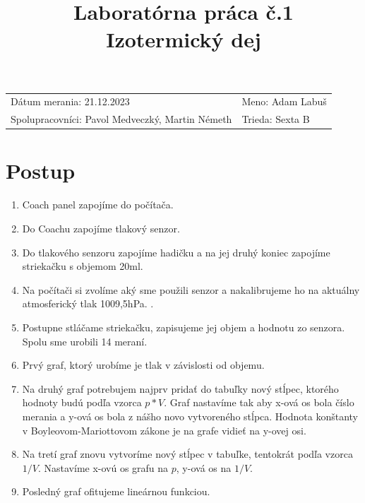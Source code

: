 \documentclass[12pt]{extarticle}
\title{%
Laboratórna práca č.1\\
Izotermický dej
}
\author{}
\date{}
\begin{document}
\begin{titlepage}
	\maketitle
	\thispagestyle{empty}
	\vfill
	\large
	\begin{tabular}{ll}
		Dátum merania: 21.12.2023 \hfill &Meno: Adam Labuš \\
		Spolupracovníci: Pavol Medveczký, Martin Németh &Trieda: Sexta B \\
	\end{tabular}
	\vspace{100pt}
\end{titlepage}

\def\present#1#2{%
	\begin{samepage}
	{\large #1}\\
	\begin{center}
		#2\\[1em]
	\end{center}
	\end{samepage}
}

\def\graf#1#2{
	\present{#1}{
		\begin{tikzpicture}
			#2
		\end{tikzpicture}
	}
}

\section{Postup}
\begin{enumerate}
\item Coach panel zapojíme do počítača.
\item Do Coachu zapojíme tlakový senzor.
\item Do tlakového senzoru zapojíme hadičku a na jej druhý koniec zapojíme striekačku s objemom 20ml.
\item Na počítači si zvolíme aký sme použili senzor a nakalibrujeme ho na aktuálny atmosferický tlak 1009,5hPa.
.
\item Postupne stláčame striekačku, zapisujeme jej objem a hodnotu zo senzora. Spolu sme urobili 14 meraní.
\item Prvý graf, ktorý urobíme je tlak v závislosti od objemu.
\item Na druhý graf potrebujem najprv pridať do tabuľky nový stĺpec, ktorého hodnoty budú podľa vzorca $p * V$. Graf nastavíme tak aby x-ová os bola číslo merania a y-ová os bola z nášho novo vytvoreného stĺpca. Hodnota konštanty v Boyleovom-Mariottovom zákone je na grafe vidieť na y-ovej osi.
\item Na tretí graf znovu vytvoríme nový stĺpec v tabuľke, tentokrát podľa vzorca $1/V$. Nastavíme x-ovú os grafu na $p$, y-ová os na $1/V$.
\item Posledný graf ofitujeme lineárnou funkciou.
\end{enumerate}
\end{document}
